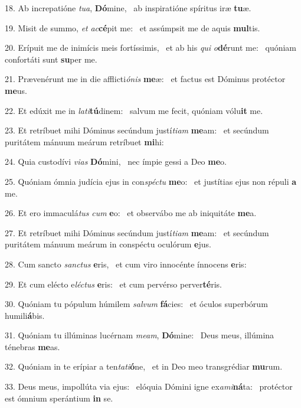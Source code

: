 18. Ab increpatióne \textit{tu}\textit{a}, \textbf{Dó}mine, \ast\  ab inspiratióne spíritus iræ \textbf{tu}æ.\

19. Misit de summo, \textit{et} \textit{ac}\textbf{cé}pit me: \ast\  et assúmpsit me de aquis \textbf{mul}tis.\

20. Erípuit me de inimícis meis fortíssimis, \dag\  et ab his \textit{qui} \textit{o}\textbf{dé}runt me: \ast\  quóniam confortáti sunt \textbf{su}per me.\

21. Prævenérunt me in die afflicti\textit{ó}\textit{nis} \textbf{me}æ: \ast\  et factus est Dóminus protéctor \textbf{me}us.\

22. Et edúxit me in \textit{la}\textit{ti}\textbf{tú}dinem: \ast\  salvum me fecit, quóniam vólu\textbf{it} me.\

23. Et retríbuet mihi Dóminus secúndum justí\textit{ti}\textit{am} \textbf{me}am: \ast\  et secúndum puritátem mánuum meárum retríbuet \textbf{mi}hi:\

24. Quia custodívi \textit{vi}\textit{as} \textbf{Dó}mini, \ast\  nec ímpie gessi a Deo \textbf{me}o.\

25. Quóniam ómnia judícia ejus in con\textit{spéc}\textit{tu} \textbf{me}o: \ast\  et justítias ejus non répuli \textbf{a} me.\

26. Et ero immaculá\textit{tus} \textit{cum} \textbf{e}o: \ast\  et observábo me ab iniquitáte \textbf{me}a.\

27. Et retríbuet mihi Dóminus secúndum justí\textit{ti}\textit{am} \textbf{me}am: \ast\  et secúndum puritátem mánuum meárum in conspéctu oculórum \textbf{e}jus.\

28. Cum sancto \textit{sanc}\textit{tus} \textbf{e}ris, \ast\  et cum viro innocénte ínnocens \textbf{e}ris:\

29. Et cum elécto e\textit{léc}\textit{tus} \textbf{e}ris: \ast\  et cum pervérso perver\textbf{té}ris.\

30. Quóniam tu pópulum húmilem \textit{sal}\textit{vum} \textbf{fá}cies: \ast\  et óculos superbórum humili\textbf{á}bis.\

31. Quóniam tu illúminas lucérnam \textit{me}\textit{am}, \textbf{Dó}mine: \ast\  Deus meus, illúmina ténebras \textbf{me}as.\

32. Quóniam in te erípiar a ten\textit{ta}\textit{ti}\textbf{ó}ne, \ast\  et in Deo meo transgrédiar \textbf{mu}rum.\

33. Deus meus, impollúta via ejus: \dag\  elóquia Dómini igne ex\textit{a}\textit{mi}\textbf{ná}ta: \ast\  protéctor est ómnium sperántium \textbf{in} se.\

